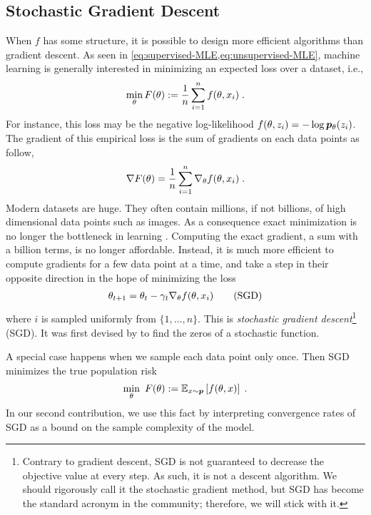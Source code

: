 \subsection{Stochastic Gradient Descent}
\label{ssec:SGD}
When $f$ has some structure, it is possible to design more efficient algorithms than gradient descent.
As seen in \cref{eq:supervised-MLE,eq:unsupervised-MLE}, machine learning is generally interested in minimizing an expected loss over a dataset, i.e.,
\begin{align}
	\min_\theta F(\theta):= \inv{n} \sum_{i=1}^n f(\theta, x_i) \; .
	\label{eq:finite-sum}
\end{align}
For instance, this loss may be the negative log-likelihood  $f(\theta, z_i) = - \log \bm{p}_{\theta}(z_i)$. 
The gradient of this empirical loss is the sum of gradients on each data points as follow,
\begin{align}
	\nabla F (\theta) = \frac{1}{n}\sum_{i=1}^n \nabla_\theta f(\theta, x_i) \; .
\end{align}
Modern datasets are huge. They often contain millions, if not billions, of high dimensional data points such as images. 
As a consequence exact minimization is no longer the bottleneck in learning \citep{bottou2008tradeoffs}. 
Computing the exact gradient, a sum with a billion terms, is no longer affordable.
Instead, it is much more efficient to compute gradients for a few data point at a time, and take a step in their opposite direction in the hope of minimizing the loss
\begin{align}
	\theta_{t+1} = \theta_t - \gamma_t \nabla_\theta f(\theta, x_i)
	\tag{SGD}
\end{align}
where $i$ is sampled uniformly from $\{1, \dots, n\}$.
This is \emph{stochastic gradient descent}\footnote{
	Contrary to gradient descent, SGD is not guaranteed to decrease the objective value at every step. 
	As such, it is not a descent algorithm. 
	We should rigorously call it the stochastic gradient method, but SGD has become the standard acronym in the community; therefore, we will stick with it.
}
(SGD).
It was first devised by \citet{robbins1951stochastic} to find the zeros of a stochastic function.


A special case happens when we sample each data point only once.
Then  SGD minimizes the true population risk 
\begin{align}
	\min_\theta \ F(\theta):= \expect[x\sim \ptrue]{f(\theta, x)} \; .
	\label{eq:population-risk}
\end{align}
In our second contribution, we use this fact by interpreting convergence rates of SGD as a bound on the sample complexity of the model. 

